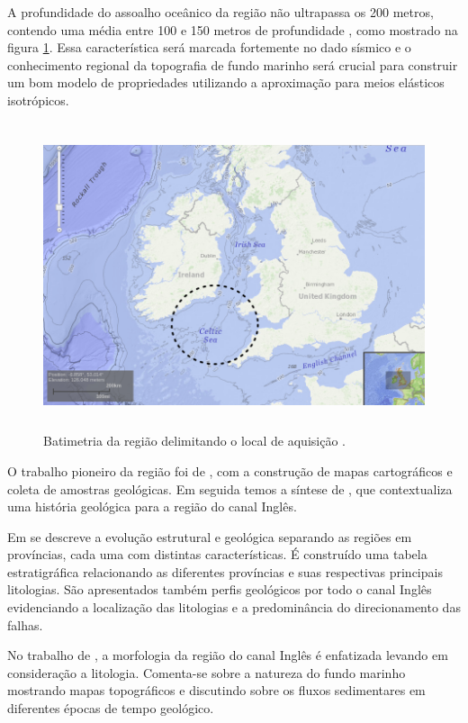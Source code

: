 \documentclass[
	12pt,				%
	openright,			%
	oneside,			%
	a4paper,			%
	english,			%
	brazil				%
	]{abntex2}
\begin{document}
	A profundidade do assoalho oceânico da região não ultrapassa os 200 metros, contendo uma média entre 100 e 150 metros de profundidade \cite{hamilton1979geology}, como mostrado na figura \ref{batimetria}. Essa característica será marcada fortemente no dado sísmico e o conhecimento regional da topografia de fundo marinho será crucial para construir um bom modelo de propriedades utilizando a aproximação para meios elásticos isotrópicos.
	
    \begin{figure}[htp!]
		\centering
		\includegraphics[width=12cm,height=9cm]{../imagens/batimetria.png}
		\caption{Batimetria da região delimitando o local de aquisição \cite{NOAA}.}
		\label{batimetria}
	\end{figure}

	O trabalho pioneiro da região foi de , com a construção de mapas cartográficos e coleta de amostras geológicas. Em seguida temos a síntese de , que contextualiza uma história geológica para a região do canal Inglês.
	
	Em  se descreve a evolução estrutural e geológica separando as regiões em províncias, cada uma com distintas características. É construído uma tabela estratigráfica relacionando as diferentes províncias e suas respectivas principais litologias. São apresentados também perfis geológicos por todo o canal Inglês evidenciando a localização das litologias e a predominância do direcionamento das falhas.
	
	No trabalho de , a morfologia da região do canal Inglês é enfatizada levando em consideração a litologia. Comenta-se sobre a natureza do fundo marinho mostrando mapas topográficos e discutindo sobre os fluxos sedimentares em diferentes épocas de tempo geológico.
	
\end{document}
